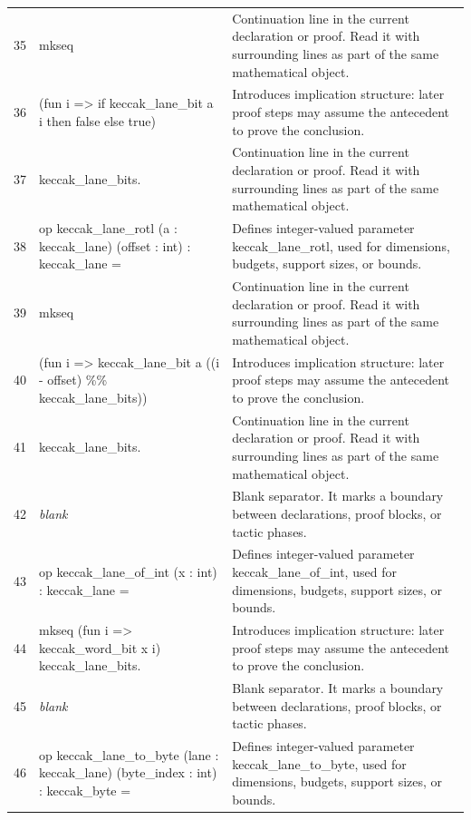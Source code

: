 \documentclass[10pt]{article}
\begin{document}
\begin{longtable}{r L{0.53\textwidth} L{0.37\textwidth}}
35 & {\ttfamily\scriptsize   mkseq} & Continuation line in the current declaration or proof.  Read it with surrounding lines as part of the same mathematical object. \\
36 & {\ttfamily\scriptsize     (fun i => if keccak\_lane\_bit a i then false else true)} & Introduces implication structure: later proof steps may assume the antecedent to prove the conclusion. \\
37 & {\ttfamily\scriptsize     keccak\_lane\_bits.} & Continuation line in the current declaration or proof.  Read it with surrounding lines as part of the same mathematical object. \\
38 & {\ttfamily\scriptsize op keccak\_lane\_rotl (a : keccak\_lane) (offset : int) : keccak\_lane =} & Defines integer-valued parameter keccak\_lane\_rotl, used for dimensions, budgets, support sizes, or bounds. \\
39 & {\ttfamily\scriptsize   mkseq} & Continuation line in the current declaration or proof.  Read it with surrounding lines as part of the same mathematical object. \\
40 & {\ttfamily\scriptsize     (fun i => keccak\_lane\_bit a ((i - offset) \%\% keccak\_lane\_bits))} & Introduces implication structure: later proof steps may assume the antecedent to prove the conclusion. \\
41 & {\ttfamily\scriptsize     keccak\_lane\_bits.} & Continuation line in the current declaration or proof.  Read it with surrounding lines as part of the same mathematical object. \\
42 & {\ttfamily\scriptsize \emph{blank}} & Blank separator.  It marks a boundary between declarations, proof blocks, or tactic phases. \\
43 & {\ttfamily\scriptsize op keccak\_lane\_of\_int (x : int) : keccak\_lane =} & Defines integer-valued parameter keccak\_lane\_of\_int, used for dimensions, budgets, support sizes, or bounds. \\
44 & {\ttfamily\scriptsize   mkseq (fun i => keccak\_word\_bit x i) keccak\_lane\_bits.} & Introduces implication structure: later proof steps may assume the antecedent to prove the conclusion. \\
45 & {\ttfamily\scriptsize \emph{blank}} & Blank separator.  It marks a boundary between declarations, proof blocks, or tactic phases. \\
46 & {\ttfamily\scriptsize op keccak\_lane\_to\_byte (lane : keccak\_lane) (byte\_index : int) : keccak\_byte =} & Defines integer-valued parameter keccak\_lane\_to\_byte, used for dimensions, budgets, support sizes, or bounds. \\

\end{longtable}
\end{document}
